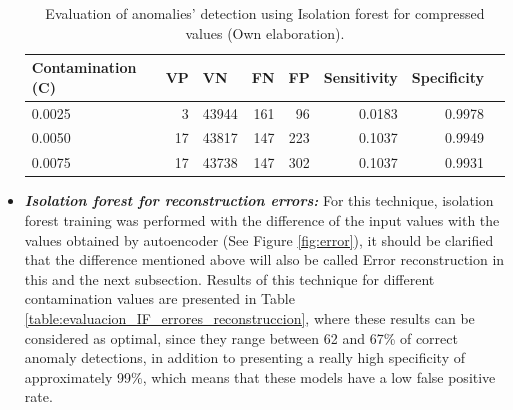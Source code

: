 \begin{itemize}
\begin{table}[H]
\centering
\begin{center}
\begin{tabular}{|l|r|r|r|r|r|r|r|}
\hline
\textbf{Contamination (C)} & \multicolumn{1}{l|}{\textbf{VP}} & \multicolumn{1}{l|}{\textbf{VN}}& \multicolumn{1}{l|}{\textbf{FN}}& \multicolumn{1}{l|}{\textbf{FP}} & \multicolumn{1}{l|}{\textbf{Sensitivity}} & \multicolumn{1}{l|}{\textbf{Specificity}} \\ \hline
0.0025 & \cellcolor[HTML]{AADD99} 3 & \cellcolor[HTML]{AADD99} 43944 & \cellcolor[HTML]{FFCE93} 161 & \cellcolor[HTML]{FFCE93} 96 & 0.0183 & 0.9978 \\ \hline
0.0050 & \cellcolor[HTML]{AADD99} 17 & \cellcolor[HTML]{AADD99} 43817 & \cellcolor[HTML]{FFCE93} 147 & \cellcolor[HTML]{FFCE93} 223 & 0.1037 & 0.9949 \\ \hline
0.0075 & \cellcolor[HTML]{AADD99} 17 & \cellcolor[HTML]{AADD99} 43738 & \cellcolor[HTML]{FFCE93} 147 & \cellcolor[HTML]{FFCE93} 302 & 0.1037 & 0.9931 \\ \hline
\end{tabular}
\end{center}
\caption{Evaluation of anomalies' detection using Isolation forest for compressed values (Own elaboration).}
\label{table:evaluacion_IF_encoded}
\end{table}

\item \textbf{\textit{Isolation forest for reconstruction errors: }}For this technique, isolation forest training was performed with the difference of the input values with the values obtained by autoencoder (See Figure \ref{fig:error}), it should be clarified that the difference mentioned above will also be called Error reconstruction in this and the next subsection. Results of this technique for different contamination values are presented in Table \ref{table:evaluacion_IF_errores_reconstruccion}, where these results can be considered as optimal, since they range between 62 and 67\% of correct anomaly detections, in addition to presenting a really high specificity of approximately 99\%, which means that these models have a low false positive rate.


\end{itemize}
